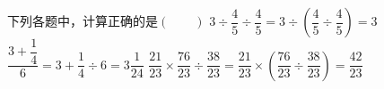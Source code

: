 下列各题中，计算正确的是\hfill$\left(\qquad\right)$
{$3\div\dfrac{4}{5}\div\dfrac{4}{5}=3\div\left(\dfrac{4}{5}\div\dfrac{4}{5}\right)=3$}
{$\dfrac{3+\dfrac{1}{4}}{6}=3+\dfrac{1}{4}\div6=3\dfrac{1}{24}$}
{$\dfrac{21}{23}×\dfrac{76}{23}\div\dfrac{38}{23}=\dfrac{21}{23}×\left(\dfrac{76}{23}\div\dfrac{38}{23}\right)=\dfrac{42}{23}$}